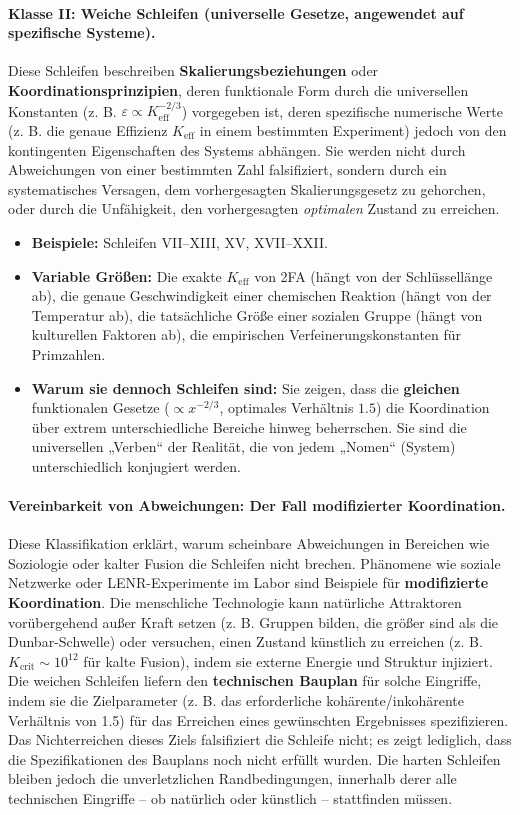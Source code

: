 \documentclass[12pt,a4paper]{article}
\begin{document}
	\paragraph{Klasse II: Weiche Schleifen (universelle Gesetze, angewendet auf spezifische Systeme).}
	Diese Schleifen beschreiben \textbf{Skalierungsbeziehungen} oder \textbf{Koordinationsprinzipien}, deren funktionale Form durch die universellen Konstanten (z. B. \(\varepsilon \propto K_{\mathrm{eff}}^{-2/3}\)) vorgegeben ist, deren spezifische numerische Werte (z. B. die genaue Effizienz \(K_{\mathrm{eff}}\) in einem bestimmten Experiment) jedoch von den kontingenten Eigenschaften des Systems abhängen. Sie werden nicht durch Abweichungen von einer bestimmten Zahl falsifiziert, sondern durch ein systematisches Versagen, dem vorhergesagten Skalierungsgesetz zu gehorchen, oder durch die Unfähigkeit, den vorhergesagten \textit{optimalen} Zustand zu erreichen.
	\begin{itemize}
		\item \textbf{Beispiele:} Schleifen VII--XIII, XV, XVII--XXII.
		\item \textbf{Variable Größen:} Die exakte \(K_{\mathrm{eff}}\) von 2FA (hängt von der Schlüssellänge ab), die genaue Geschwindigkeit einer chemischen Reaktion (hängt von der Temperatur ab), die tatsächliche Größe einer sozialen Gruppe (hängt von kulturellen Faktoren ab), die empirischen Verfeinerungskonstanten für Primzahlen.
		\item \textbf{Warum sie dennoch Schleifen sind:} Sie zeigen, dass die \textbf{gleichen} funktionalen Gesetze (\(\propto x^{-2/3}\), optimales Verhältnis \(1.5\)) die Koordination über extrem unterschiedliche Bereiche hinweg beherrschen. Sie sind die universellen „Verben“ der Realität, die von jedem „Nomen“ (System) unterschiedlich konjugiert werden.
	\end{itemize}
	
	\paragraph{Vereinbarkeit von Abweichungen: Der Fall modifizierter Koordination.}
	Diese Klassifikation erklärt, warum scheinbare Abweichungen in Bereichen wie Soziologie oder kalter Fusion die Schleifen nicht brechen. Phänomene wie soziale Netzwerke oder LENR-Experimente im Labor sind Beispiele für \textbf{modifizierte Koordination}. Die menschliche Technologie kann natürliche Attraktoren vorübergehend außer Kraft setzen (z. B. Gruppen bilden, die größer sind als die Dunbar-Schwelle) oder versuchen, einen Zustand künstlich zu erreichen (z. B. \(K_{\mathrm{crit}} \sim 10^{12}\) für kalte Fusion), indem sie externe Energie und Struktur injiziert. Die weichen Schleifen liefern den \textbf{technischen Bauplan} für solche Eingriffe, indem sie die Zielparameter (z. B. das erforderliche kohärente/inkohärente Verhältnis von 1.5) für das Erreichen eines gewünschten Ergebnisses spezifizieren. Das Nichterreichen dieses Ziels falsifiziert die Schleife nicht; es zeigt lediglich, dass die Spezifikationen des Bauplans noch nicht erfüllt wurden. Die harten Schleifen bleiben jedoch die unverletzlichen Randbedingungen, innerhalb derer alle technischen Eingriffe – ob natürlich oder künstlich – stattfinden müssen.
	
\end{document}
